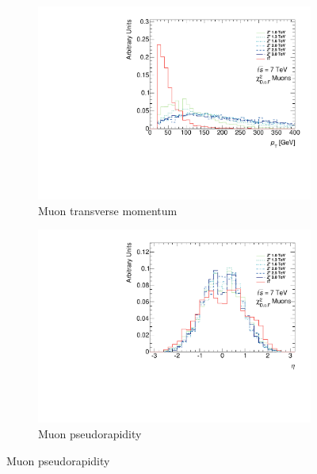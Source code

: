 \begin{figure}[htbp]
  \centering
  \begin{subfigure}{0.48\textwidth}
    \includegraphics[width=\textwidth]{PartBoosted/Plots/h_smt_pt.pdf}
    \caption{Muon transverse momentum}\label{fig:BoostedControlSMTpt}
  \end{subfigure}
  \begin{subfigure}{0.48\textwidth}
    \includegraphics[width=\textwidth]{PartBoosted/Plots/h_smt_eta.pdf}
    \caption{Muon pseudorapidity}\label{fig:BoostedControlSMTeta}
  \end{subfigure}


\end{figure}
